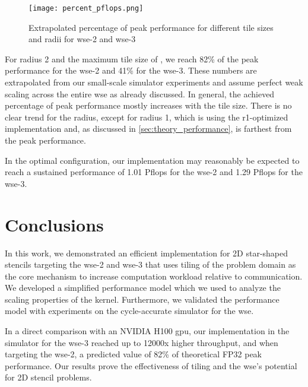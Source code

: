 \begin{figure}[h]
    \centering
    \texttt{[image: percent\_pflops.png]}
    \caption{Extrapolated percentage of peak performance for different tile sizes and radii for \ac{wse}-2 and \ac{wse}-3}
    \label{fig:percent_pflops}
\end{figure}

For radius 2 and the maximum tile size of , we reach \num{82}\% of the peak performance for the \ac{wse}-2 and \num{41}\% for the \ac{wse}-3.
These numbers are extrapolated from our small-scale simulator experiments and assume perfect weak scaling across the entire \ac{wse} as already discussed. 
In general, the achieved percentage of peak performance mostly increases with the tile size. There is no clear trend for the radius, except for radius 1, which is using the r1-optimized implementation and, as discussed in \autoref{sec:theory_performance}, is farthest from the peak performance.

In the optimal configuration, our implementation may reasonably be expected to reach a sustained performance of 1.01 P\ac{flops} for the \ac{wse}-2 and 1.29 P\ac{flops} for the \ac{wse}-3.

\section{Conclusions}
In this work, we demonstrated an efficient implementation for 2D star-shaped stencils targeting the \ac{wse}-2 and \ac{wse}-3 that uses tiling of the problem domain as the core mechanism to increase computation workload relative to communication. We developed a simplified performance model which we used to analyze the scaling properties of the kernel. Furthermore, we validated the performance model with experiments on the cycle-accurate simulator for the \ac{wse}.

In a direct comparison with an NVIDIA H100 \ac{gpu}, our implementation in the simulator for the \ac{wse}-3 reached up to 12000x higher throughput, and when targeting the \ac{wse}-2, a predicted value of 82\% of theoretical FP32 peak performance. Our results prove the effectiveness of tiling and the \ac{wse}'s potential for 2D stencil problems.